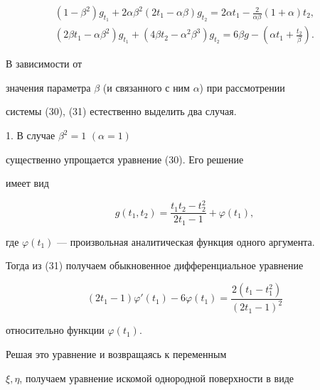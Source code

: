 \begin{gather}


 ( 1- \beta^2) g_{t_1} +


 2 \alpha \beta^2 ( 2 t_1 - \alpha \beta )g_{t_2} = 


 2 \alpha t_1 - \frac 2{\alpha \beta} ( 1 + \alpha) t_2, \\


%


 ( 2 \beta t_1 - \alpha \beta^2 ) g_{t_1} 


 + ( 4 \beta t_2 - \alpha^2 \beta^3 ) g_{t_2} = 


6 \beta g - ( \alpha t_1 + \frac{t_2}{\beta} ) .


\end{gather}








В зависимости от 


значения параметра $ \beta $ (и связанного с ним $ \alpha $) при рассмотрении


системы (30), (31) естественно выделить два случая.








1. В случае $ \beta^2 = 1$ $(\alpha = 1) $


существенно упрощается уравнение (30). Его решение 


имеет вид


$$


 g(t_1,t_2) = \frac{ t_1 t_2 - t_2^2 }{ 2 t_1 - 1 } + 


\varphi(t_1),


$$


где $ \varphi(t_1) $ --- произвольная аналитическая функция одного аргумента.


 Тогда из (31) получаем обыкновенное дифференциальное уравнение


$$


 (2 t_1 - 1) \varphi'(t_1) - 6 \varphi(t_1) = 


 \frac{ 2 ( t_1 - t_1^2 ) }{ ( 2 t_1 - 1 )^2 }


$$


относительно функции $ \varphi(t_1) $.


 Решая это уравнение и возвращаясь к переменным 


$ \xi, \eta $, получаем уравнение искомой однородной поверхности в виде


$$


